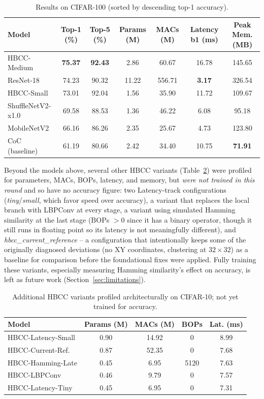 \documentclass[journal]{IEEEtran}
\begin{document}
\begin{table}[t]
\centering
\caption{Results on CIFAR-100 (sorted by descending top-1 accuracy).}
\label{tab:cifar100}
\begin{tabular}{lcccccc}
\toprule
\textbf{Model} & \textbf{Top-1 (\%)} & \textbf{Top-5 (\%)} & \textbf{Params (M)} & \textbf{MACs (M)} & \textbf{Latency b1 (ms)} & \textbf{Peak Mem. (MB)} \\
\midrule
HBCC-Medium & \textbf{75.37} & \textbf{92.43} & 2.86 & 60.67 & 16.78 & 145.65 \\
ResNet-18 & 74.23 & 90.32 & 11.22 & 556.71 & \textbf{3.17} & 326.54 \\
HBCC-Small & 73.01 & 92.04 & 1.56 & 35.90 & 11.72 & 109.67 \\
ShuffleNetV2-x1.0 & 69.58 & 88.53 & 1.36 & 46.22 & 6.08 & 95.18 \\
MobileNetV2 & 66.16 & 86.26 & 2.35 & 25.67 & 4.73 & 123.80 \\
CoC (baseline) & 61.19 & 80.66 & 2.42 & 34.40 & 10.75 & \textbf{71.91} \\
\bottomrule
\end{tabular}
\end{table}

Beyond the models above, several other HBCC variants (Table~\ref{tab:cifar10_arch_only}) were profiled for parameters, MACs, BOPs, latency, and memory, but \emph{were not trained in this round} and so have no accuracy figure: two Latency-track configurations (\textit{tiny}/\textit{small}, which favor speed over accuracy), a variant that replaces the local branch with LBPConv at every stage, a variant using simulated Hamming similarity at the last stage (BOPs $>0$ since it has a binary operator, though it still runs in floating point so its latency is not meaningfully different), and \textit{hbcc\_current\_reference} -- a configuration that intentionally keeps some of the originally diagnosed deviations (no XY coordinates, clustering at $32\times32$) as a baseline for comparison before the foundational fixes were applied. Fully training these variants, especially measuring Hamming similarity's effect on accuracy, is left as future work (Section~\ref{sec:limitations}).

\begin{table}[H]
\centering
\caption{Additional HBCC variants profiled architecturally on CIFAR-10; not yet trained for accuracy.}
\label{tab:cifar10_arch_only}
\begin{tabular}{lcccc}
\toprule
\textbf{Model} & \textbf{Params (M)} & \textbf{MACs (M)} & \textbf{BOPs} & \textbf{Lat. (ms)} \\
\midrule
HBCC-Latency-Small & 0.90 & 14.92 & 0 & 8.99 \\
HBCC-Current-Ref. & 0.87 & 52.35 & 0 & 7.68 \\
HBCC-Hamming-Late & 0.45 & 6.95 & 5120 & 7.63 \\
HBCC-LBPConv & 0.46 & 9.79 & 0 & 7.57 \\
HBCC-Latency-Tiny & 0.45 & 6.95 & 0 & 7.31 \\
\bottomrule
\end{tabular}
\end{table}
\end{document}
